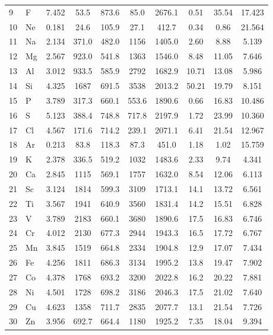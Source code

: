 \documentclass[12pt,a4paper]{article}
\theoremstyle{remark}
\begin{document}
\begin{longtable}{@{}llcccccccc@{}}
		9  & F   & 7.452 & 53.5   & 873.6  & 85.0   & 2676.1 & 0.51  & 35.54 & 17.423 \\
		10 & Ne  & 0.181 & 24.6   & 105.9  & 27.1   & 412.7  & 0.34  & 0.86  & 21.564 \\
		11 & Na  & 2.134 & 371.0  & 482.0  & 1156   & 1405.0 & 2.60  & 8.88  & 5.139 \\
		12 & Mg  & 2.567 & 923.0  & 541.8  & 1363   & 1546.0 & 8.48  & 11.05 & 7.646 \\
		13 & Al  & 3.012 & 933.5  & 585.9  & 2792   & 1682.9 & 10.71 & 13.08 & 5.986 \\
		14 & Si  & 4.325 & 1687   & 691.5  & 3538   & 2013.2 & 50.21 & 19.79 & 8.151 \\
		15 & P   & 3.789 & 317.3  & 660.1  & 553.6  & 1890.6 & 0.66  & 16.83 & 10.486 \\
		16 & S   & 5.123 & 388.4  & 748.8  & 717.8  & 2197.9 & 1.72  & 23.99 & 10.360 \\
		17 & Cl  & 4.567 & 171.6  & 714.2  & 239.1  & 2071.1 & 6.41  & 21.54 & 12.967 \\
		18 & Ar  & 0.213 & 83.8   & 118.3  & 87.3   & 451.0  & 1.18  & 1.02  & 15.759 \\
		19 & K   & 2.378 & 336.5  & 519.2  & 1032   & 1483.6 & 2.33  & 9.74  & 4.341 \\
		20 & Ca  & 2.845 & 1115   & 569.1  & 1757   & 1632.0 & 8.54  & 12.06 & 6.113 \\
		21 & Sc  & 3.124 & 1814   & 599.3  & 3109   & 1713.1 & 14.1  & 13.72 & 6.561 \\
		22 & Ti  & 3.567 & 1941   & 640.9  & 3560   & 1831.4 & 14.2  & 15.51 & 6.828 \\
		23 & V   & 3.789 & 2183   & 660.1  & 3680   & 1890.6 & 17.5  & 16.83 & 6.746 \\
		24 & Cr  & 4.012 & 2130   & 677.3  & 2944   & 1943.3 & 16.5  & 17.72 & 6.767 \\
		25 & Mn  & 3.845 & 1519   & 664.8  & 2334   & 1904.8 & 12.9  & 17.07 & 7.434 \\
		26 & Fe  & 4.256 & 1811   & 686.3  & 3134   & 1995.2 & 13.8  & 19.47 & 7.902 \\
		27 & Co  & 4.378 & 1768   & 693.2  & 3200   & 2022.8 & 16.2  & 20.22 & 7.881 \\
		28 & Ni  & 4.501 & 1728   & 698.2  & 3186   & 2046.3 & 17.5  & 21.02 & 7.640 \\
		29 & Cu  & 4.623 & 1358   & 711.7  & 2835   & 2077.7 & 13.1  & 21.54 & 7.726 \\
		30 & Zn  & 3.956 & 692.7  & 664.4  & 1180   & 1925.2 & 7.35  & 18.04 & 9.394 \\

\end{longtable}
\end{document}
